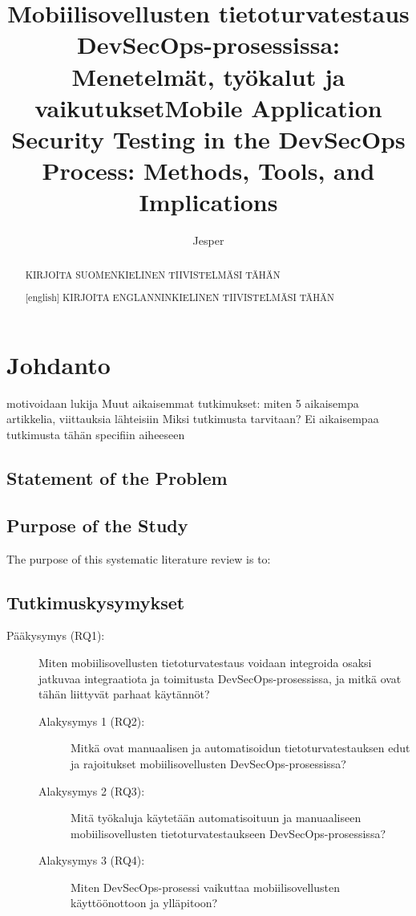 \documentclass[bscthesis,finnish,oneside,biblatex]{uefcsthesis}
\title{Mobiilisovellusten tietoturvatestaus DevSecOps-prosessissa: Menetelmät, työkalut ja vaikutukset} %
\title[english]{Mobile Application Security Testing in the DevSecOps Process: Methods, Tools, and Implications} %
\author{Jesper}{Kauppinen} %
\date{\thismonth} %
\begin{document}
    \maketitle
    \begin{abstract}
        KIRJOITA SUOMENKIELINEN TIIVISTELMÄSI TÄHÄN
    \end{abstract}

    \begin{abstract}[english]
        KIRJOITA ENGLANNINKIELINEN TIIVISTELMÄSI TÄHÄN
    \end{abstract}

    \frontmatter
    \tableofcontents
    \mainmatter


    \chapter{Johdanto}
    \label{cha:johdanto}

    motivoidaan lukija Muut aikaisemmat tutkimukset: miten 5 aikaisempa artikkelia, viittauksia lähteisiin Miksi tutkimusta tarvitaan? Ei aikaisempaa tutkimusta tähän specifiin aiheeseen


    \section{Statement of the Problem}
    \label{sec:statement-of-problem}


    \section{Purpose of the Study}
    \label{sec:purpose-of-study}

    The purpose of this systematic literature review is to:


    \section{Tutkimuskysymykset}
    \label{sec:research-questions}

    \begin{description}
        \item[Pääkysymys (RQ1):] Miten mobiilisovellusten tietoturvatestaus voidaan integroida osaksi jatkuvaa integraatiota ja toimitusta DevSecOps-prosessissa, ja mitkä ovat tähän liittyvät parhaat käytännöt?
        \begin{description}
            \item[Alakysymys 1 (RQ2):] Mitkä ovat manuaalisen ja automatisoidun tietoturvatestauksen edut ja rajoitukset mobiilisovellusten DevSecOps-prosessissa?
            \item[Alakysymys 2 (RQ3):] Mitä työkaluja käytetään automatisoituun ja manuaaliseen mobiilisovellusten tietoturvatestaukseen DevSecOps-prosessissa?
            \item[Alakysymys 3 (RQ4):] Miten DevSecOps-prosessi vaikuttaa mobiilisovellusten käyttöönottoon ja ylläpitoon?
        \end{description}
    \end{description}
\end{document}
